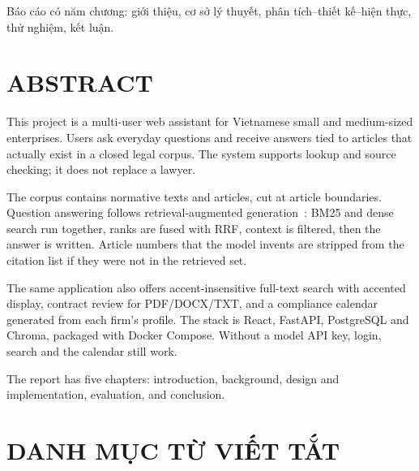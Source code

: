 Báo cáo có năm chương: giới thiệu, cơ sở lý thuyết, phân tích--thiết kế--hiện
thực, thử nghiệm, kết luận.

\clearpage

\chapter*{ABSTRACT}

This project is a multi-user web assistant for Vietnamese small and
medium-sized enterprises. Users ask everyday questions and receive answers
tied to articles that actually exist in a closed legal corpus. The system
supports lookup and source checking; it does not replace a lawyer.

The corpus contains \soLuat{} normative texts and \soDieu{} articles, cut at
article boundaries. Question answering follows retrieval-augmented
generation~\cite{lewis2020rag}: BM25 and dense search run together, ranks are
fused with RRF, context is filtered, then the answer is written. Article
numbers that the model invents are stripped from the citation list if they
were not in the retrieved set.

The same application also offers accent-insensitive full-text search with
accented display, contract review for PDF/DOCX/TXT, and a compliance calendar
generated from each firm's profile. The stack is React, FastAPI, PostgreSQL
and Chroma, packaged with Docker Compose. Without a model API key, login,
search and the calendar still work.

The report has five chapters: introduction, background, design and
implementation, evaluation, and conclusion.

\clearpage

\tableofcontents
\clearpage

{}
\chapter*{DANH MỤC TỪ VIẾT TẮT}

